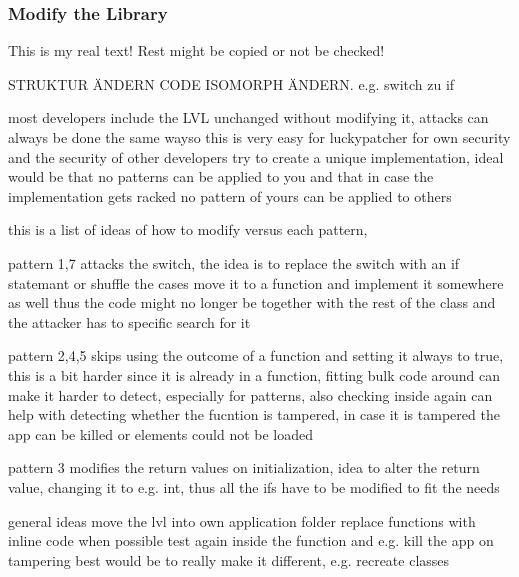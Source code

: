 \subsubsection{Modify the Library} \label{subsubsection:counter-modifications-library}
This is my real text! Rest might be copied or not be checked!

STRUKTUR ÄNDERN
CODE ISOMORPH ÄNDERN. e.g. switch zu if

most developers include the LVL unchanged without modifying it, attacks can always be done the same wayso this is very easy for luckypatcher
for own security and the security of other developers try to create a unique implementation,
ideal would be that no patterns can be applied to you and that in case the implementation gets racked no pattern of yours can be applied to others

this is a list of ideas of how to modify versus each pattern,

pattern 1,7 attacks the switch, the idea is to replace the switch with an if statemant or shuffle the cases
move it to a function and implement it somewhere as well thus the code might no longer be together with the rest of the class and the attacker has to specific search for it

pattern 2,4,5 skips using the outcome of a function and setting it always to true, this is a bit harder since it is already in a function, fitting bulk code around can make it harder to detect, especially for patterns, also checking inside again can help with detecting whether the fucntion is tampered, in case it is tampered the app can be killed or elements could not be loaded

pattern 3 modifies the return values on initialization, idea to alter the return value, changing it to e.g. int, thus all the ifs have to be modified to fit the needs


general ideas
move the lvl into own application folder
replace functions with inline code when possible
test again inside the function and e.g. kill the app on tampering
best would be to really make it different, e.g. recreate classes

